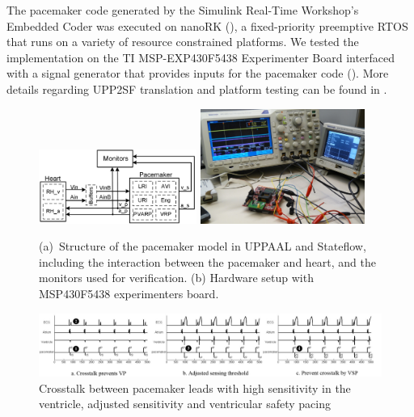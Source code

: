 The pacemaker code generated by the Simulink Real-Time Workshop's Embedded Coder was executed on nanoRK (\cite{nanork}), a fixed-priority preemptive RTOS that runs on a variety of resource constrained platforms. We tested the implementation on the TI MSP-EXP430F5438 Experimenter Board interfaced with a signal generator that provides inputs for the pacemaker code (). More details regarding UPP2SF translation and platform testing can be found in \cite{TECS}.

\begin{figure}[!t]
\centering
		\subfigure 
		{			
		\includegraphics[width=0.46\textwidth]{figs/HM_PM_newMon.png}
		\label{fig:hm_pm}
		}
		\subfigure 
		{	
			\includegraphics[width=0.48\textwidth]{figs/HW_setup1.png}
			\label{fig:PM_timer}
		} 
\caption{(a)~Structure of the pacemaker model in UPPAAL and Stateflow, including the interaction between the pacemaker and heart, and the monitors used for verification. (b) Hardware setup with MSP430F5438 experimenters board.}
\label{fig:setup}
\end{figure} 

\begin{figure}[b]
\center
\vspace{-10pt}
		\includegraphics[width=\textwidth]{figs/crosstalk_all.pdf}
\vspace{-20pt}
\caption{Crosstalk between pacemaker leads with high sensitivity in the ventricle, adjusted sensitivity and ventricular safety pacing}
\label{fig:crosstalk}
\vspace{-15pt}
\end{figure}
